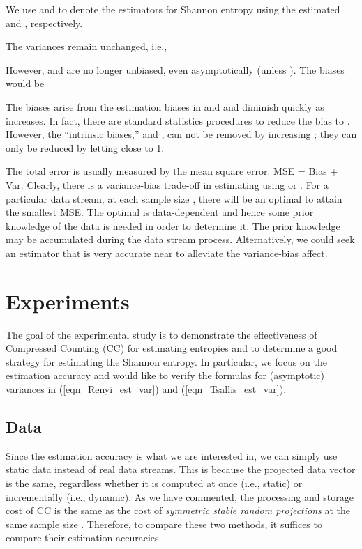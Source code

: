 \documentclass{sig-alternate}
\begin{document}
We use  and  to denote the estimators for Shannon entropy using the estimated  and , respectively.

The variances remain unchanged, i.e.,



However,  and  are no longer unbiased, even asymptotically (unless ). The biases would be

The   biases arise from the estimation biases in  and  and diminish  quickly as  increases. In fact, there are standard statistics procedures to reduce the  bias to .  However, the ``intrinsic biases,''  and , can not be removed by increasing ; they can only be reduced by letting  close to 1.



The total error is usually measured by the mean square error: MSE = Bias + Var. Clearly, there is a variance-bias trade-off in estimating  using  or .  For a particular data stream, at each sample size , there will be an optimal  to attain the smallest MSE. The optimal  is data-dependent and hence some prior knowledge of the data is needed in order to determine it. The prior knowledge may be accumulated during the data stream process. Alternatively, we could seek an estimator that is very accurate near  to alleviate the variance-bias affect.

\section{Experiments}\label{sec_exp}

The goal of the experimental study is to demonstrate the effectiveness of Compressed Counting (CC) for estimating entropies and to determine a good strategy for estimating the Shannon entropy.  In particular, we focus on the estimation accuracy and would like to verify the formulas for (asymptotic) variances in (\ref{eqn_Renyi_est_var}) and (\ref{eqn_Tsallis_est_var}).  

\subsection{Data}

Since the estimation accuracy is what we are interested in, we can simply use static data instead of real data streams. This is because the projected data vector  is the same, regardless whether it is computed at once  (i.e., static) or incrementally (i.e., dynamic). As we have commented, the processing and storage cost of CC is the same as the cost of {\em symmetric stable random projections} at the same sample size . Therefore, to compare these two methods, it suffices to compare their estimation accuracies.
\end{document}
